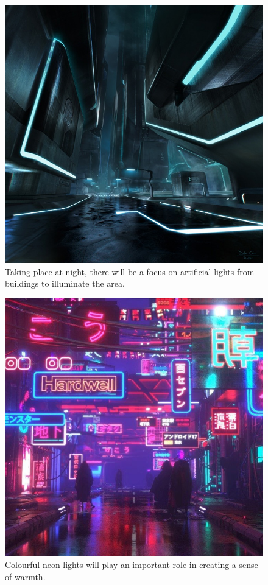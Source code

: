 \documentclass{article}
\theoremstyle{definition}
\begin{document}
\begin{figure}[htpb]
  \centering
  \includegraphics[width=0.8\linewidth]{theme01.jpg}
  \caption{Taking place at night, there will be a focus on artificial lights
  from buildings to illuminate the area.}
\label{fig:theme01}
\end{figure}

\begin{figure}[htpb]
  \centering
  \includegraphics[width=0.8\linewidth]{theme02.jpg}
  \caption{Colourful neon lights will play an important role in creating
  a sense of warmth.}
\label{fig:theme02}
\end{figure}
\end{document}
